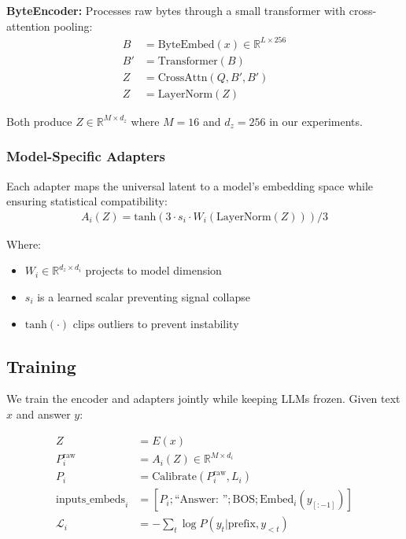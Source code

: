 \documentclass{article}
\begin{document}
\textbf{ByteEncoder:} Processes raw bytes through a small transformer with cross-attention pooling:
\begin{align}
B &= \text{ByteEmbed}(x) \in \mathbb{R}^{L \times 256} \\
B' &= \text{Transformer}(B) \\
Z &= \text{CrossAttn}(Q, B', B') \\
Z &= \text{LayerNorm}(Z)
\end{align}

Both produce $Z \in \mathbb{R}^{M \times d_z}$ where $M=16$ and $d_z=256$ in our experiments.

\subsubsection{Model-Specific Adapters}

Each adapter maps the universal latent to a model's embedding space while ensuring statistical compatibility:
\begin{align}
A_i(Z) = \text{tanh}(3 \cdot s_i \cdot W_i(\text{LayerNorm}(Z))) / 3
\end{align}

Where:
\begin{itemize}
\item $W_i \in \mathbb{R}^{d_z \times d_i}$ projects to model dimension
\item $s_i$ is a learned scalar preventing signal collapse
\item $\text{tanh}(\cdot)$ clips outliers to prevent instability
\end{itemize}

\subsection{Training}

We train the encoder and adapters jointly while keeping LLMs frozen. Given text $x$ and answer $y$:

\begin{align}
Z &= E(x) \\
P_i^{\text{raw}} &= A_i(Z) \in \mathbb{R}^{M \times d_i} \\
P_i &= \text{Calibrate}(P_i^{\text{raw}}, L_i) \\
\text{inputs\_embeds}_i &= [P_i; \text{``Answer: ''}; \text{BOS}; \text{Embed}_i(y_{[:-1]})] \\
\mathcal{L}_i &= -\sum_t \log P(y_t | \text{prefix}, y_{<t})
\end{align}
\end{document}
